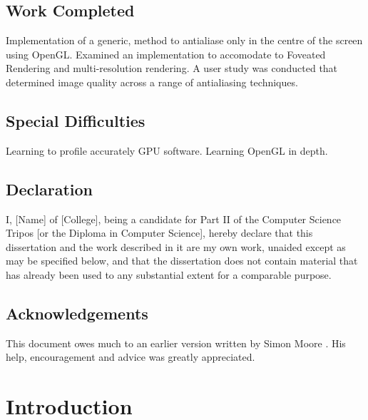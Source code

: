 \documentclass[12pt,a4paper,twoside,openright]{report}
\begin{document}
\section*{Work Completed}

Implementation of a generic, method to antialiase only in the centre of the screen using OpenGL. Examined an implementation to accomodate to Foveated Rendering and multi-resolution rendering.
A user study was conducted that determined image quality across a range of antialiasing techniques.

\section*{Special Difficulties}

Learning to profile accurately GPU software.
Learning OpenGL in depth.
 
\newpage
\section*{Declaration}

I, [Name] of [College], being a candidate for Part II of the Computer
Science Tripos [or the Diploma in Computer Science], hereby declare
that this dissertation and the work described in it are my own work,
unaided except as may be specified below, and that the dissertation
does not contain material that has already been used to any substantial
extent for a comparable purpose.

\bigskip
{}

\medskip
{}

\tableofcontents

\listoffigures

\newpage
\section*{Acknowledgements}

This document owes much to an earlier version written by Simon Moore
\cite{Moore95}.  His help, encouragement and advice was greatly 
appreciated.


\pagestyle{headings}

\chapter{Introduction}
\end{document}
